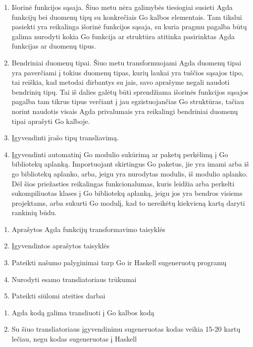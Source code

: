 \documentclass{VUMIFPSkursinis}
\begin{document}
\begin{enumerate}[noitemsep]
  \item Išorinė funkcijos sąsaja. Šiuo metu nėra galimybės tiesiogiai susieti Agda funkcijų bei duomenų tipų su konkrečiais Go kalbos elementais. Tam tikslui pasiekti yra reikalinga išorinė funkcijos sąsaja, su kuria pragmu pagalba būtų galima nurodyti kokia Go funkcija ar struktūra atitinka pasirinktas Agda funkcijas ar duomenų tipus.
  \item Bendriniai duomenų tipai. Šiuo metu transformuojami Agda duomenų tipai yra paverčiami į tokius duomenų tipas, kurių laukai yra tuščios sąsajos tipo, tai reiškia, kad metodai dirbantys su jais, savo aprašyme negali naudoti bendrinių tipų. Tai iš dalies galėtų būti sprendžiama išorinės funkcijos sąsajos pagalba tam tikrus tipus verčiant į jau egzistuojančias Go struktūras, tačiau norint naudotis visais Agda privalumais yra reikalingi bendriniai duomenų tipai  aprašyti Go kalboje.
  \item Įgyvendinti įrašo tipų transliavimą. 
  \item Įgyvendinti automatinį Go modulio sukūrimą ar paketų perkėlimą į Go bibliotekų aplanką. Importuojant skirtingus Go paketus, jie yra imami arba iš go bibliotekų aplanko, arba, jeigu yra nurodytas modulis, iš modulio aplanko. Dėl šios priežasties reikalingas funkcionalumas, kuris leidžia arba perkelti sukompiliuotas klases į Go bibliotekų aplanką, jeigu jos yra bendros visiems projektams, arba sukurti Go modulį, kad to nereikėtų kiekvieną kartą daryti rankinių būdu.
\end{enumerate}
\begin{enumerate}[noitemsep]
  \item Aprašytos Agda funkcijų transformavimo taisyklės
  \item Įgyvendintos aprašytos taisyklės
  \item Pateikti našumo palyginimai tarp Go ir Haskell sugeneruotų programų
  \item Nurodyti esamo transliatoriaus trūkumai
  \item Pateikti siūlomi ateities darbai
\end{enumerate}
\begin{enumerate}[noitemsep]
  \item Agda kodą galima transliuoti į Go kalbos kodą
  \item Su šiuo transliatoriaus įgyvendinimu sugeneruotas kodas veikia 15-20 kartų lečiau, negu kodas sugeneruotas į Haskell
\end{enumerate}
\end{document}
